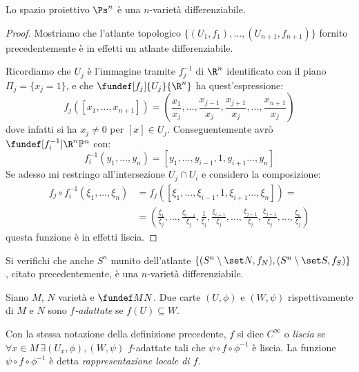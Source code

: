 

\begin{prop}
	Lo spazio proiettivo $\Ps^n$ è una $n$-varietà differenziabile.
\end{prop}

\begin{proof}
	Mostriamo che l'atlante topologico
	$\{(U_1,f_1),\dots,(U_{n+1},f_{n+1})\}$
	fornito precedentemente è in effetti un atlante differenziabile.

	Ricordiamo che $U_j$ è l'immagine tramite $f_j^{-1}$ di $\R^n$
	identificato con il piano $\Pi_{j}= \{x_{j}=1 \}$,
	e che $\fundef[f_j]{U_j}{\R^n}$ ha quest'espressione:
	\[f_j([x_1,\dots,x_{n+1}])=
	\left(\frac{x_1}{x_j},\dots,\frac{x_{j-1}}{x_j},\frac{x_{j+1}}{x_j},\dots,\frac{x_{n+1}}{x_j}\right)\]
	dove infatti si ha $x_j\neq 0$ per $[x]\in U_j$.
	Conseguentemente avrò $\fundef[f_i^{-1}]{\R^n}{\mathbb{P}^n}$ con:
	\[f_i^{-1}(y_1,\dots,y_n)=[y_1,\dots,y_{i-1},1,y_{i+1}\dots,y_n]\]
	Se adesso mi restringo all'intersezione $U_j \cap U_i$ e considero la composizione:
	\begin{align*}
		f_j \circ f_i^{-1}(\xi_1,\dots,\xi_n) &=
		f_j([\xi_1,\dots,\xi_{i-1},1,\xi_{i+1}\dots,\xi_n]) = \\
		&= \left( \frac{\xi_1}{\xi_j},\dots,
		\frac{\xi_{i-1}}{\xi_j},\frac{1}{\xi_j},\frac{\xi_{i+1}}{\xi_j},\dots,
		\frac{\xi_{j-1}}{\xi_j},\frac{\xi_{j+1}}{\xi_j},\dots,
		\frac{\xi_n}{\xi_j} \right)
	\end{align*}
	questa funzione è in effetti liscia.
\end{proof}

\begin{ex}
	Si verifichi che anche $S^n$ munito dell'atlante
	$\{(S^n\setminus \set N,f_N),(S^n\setminus\set S,f_S)\}$,
	citato precedentemente, è una $n$-varietà differenziabile.
\end{ex}

\begin{defn}
	Siano $M$, $N$ varietà e $\fundef MN$.
	Due carte $(U,\phi)$ e $(W,\psi)$ rispettivamente di $M$ e $N$
	sono \emph{$f$-adattate} se $f(U)\subseteq W$.
\end{defn}

\begin{defn}
	Con la stessa notazione della definizione precedente,
	$f$ si dice \emph{$C^\infty$} o \emph{liscia} se
	$\forall x \in M \, \exists (U_x,\phi), (W,\psi)$ $f$-adattate tali che
	$\psi \circ f \circ \phi^{-1}$ è liscia.
	La funzione $\psi \circ f \circ \phi^{-1}$ è detta \emph{rappresentazione locale di $f$}.
\end{defn}

